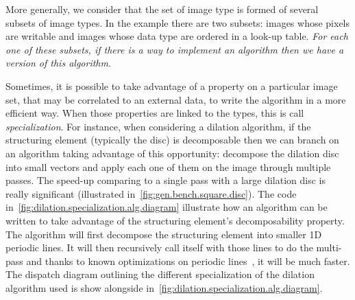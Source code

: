 More generally, we consider that the set of image type is formed of several subsets of image types. In the example there
are two subsets: images whose pixels are writable and images whose data type are ordered in a look-up table. \emph{For
  each one of these subsets, if there is a way to implement an algorithm then we have a \emph{version} of this algorithm}.

Sometimes, it is possible to take advantage of a property on a particular image set, that may be correlated to an
external data, to write the algorithm in a more efficient way. When those properties are linked to the types, this is
call \emph{specialization}. For instance, when considering a dilation algorithm, if the structuring element (typically
the disc) is decomposable then we can branch on an algorithm taking advantage of this opportunity: decompose the
dilation disc into small vectors and apply each one of them on the image through multiple passes. The speed-up comparing
to a single pass with a large dilation disc is really significant (illustrated in~\ref{fig:gen.bench.square.disc}). The
code in~\ref{fig:dilation.specialization.alg.diagram} illustrate how an algorithm can be written to take advantage of
the structuring element's decomposability property. The algorithm will first decompose the structuring element into
smaller 1D periodic lines. It will then recursively call itself with those lines to do the multi-pass and thanks to
known optimizations on periodic lines~\parencite{vanherk.1992.localminmax}, it will be much faster. The dispatch diagram
outlining the different specialization of the dilation algorithm used is show alongside
in~\cref{fig:dilation.specialization.alg.diagram}.

